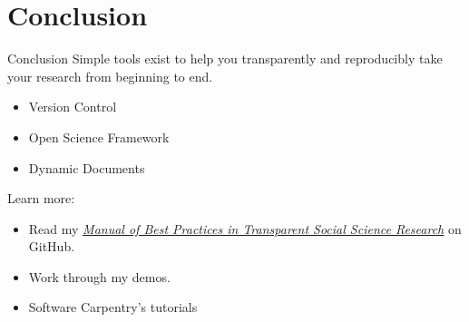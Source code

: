 \documentclass{beamer}
\begin{document}
\section{Conclusion}
\begin{frame}{Conclusion}
Simple tools exist to help you transparently and reproducibly take your research from beginning to end. 
\begin {itemize}

\item Version Control
\item Open Science Framework
\item Dynamic Documents
\end{itemize} 

Learn more: 
\begin{itemize}
\item
Read my \href{http://github.com/garretchristensen/manual}{\textit{Manual of Best Practices in Transparent Social Science Research}} on GitHub.

\item Work through my demos.\href{https://github.com/BITSS/ICPSR2016}{}
\item Software Carpentry's tutorials \href{http://www.software-carpentry.org/lessons}{}
\end{itemize}
\end{frame}
\end{document}
